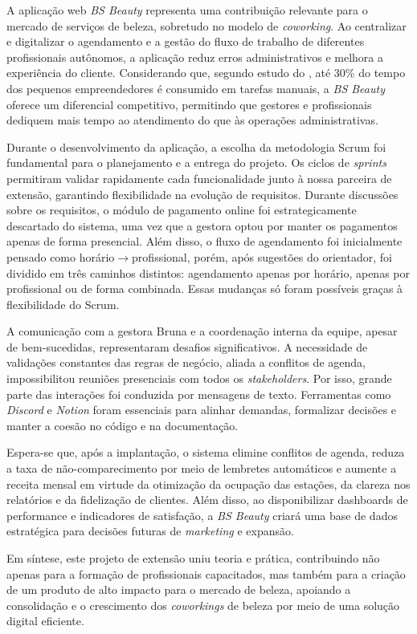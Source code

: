 

A aplicação web \emph{BS Beauty} representa uma contribuição relevante para o mercado de serviços de beleza, sobretudo no modelo de \emph{coworking}. Ao centralizar e digitalizar o agendamento e a gestão do fluxo de trabalho de diferentes profissionais autônomos, a aplicação reduz erros administrativos e melhora a experiência do cliente. Considerando que, segundo estudo do \cite{senac2022}, até 30\% do tempo dos pequenos empreendedores é consumido em tarefas manuais, a \emph{BS Beauty} oferece um diferencial competitivo, permitindo que gestores e profissionais dediquem mais tempo ao atendimento do que às operações administrativas.

Durante o desenvolvimento da aplicação, a escolha da metodologia Scrum foi fundamental para o planejamento e a entrega do projeto. Os ciclos de \emph{sprints} permitiram validar rapidamente cada funcionalidade junto à nossa parceira de extensão, garantindo flexibilidade na evolução de requisitos. Durante discussões sobre os requisitos, o módulo de pagamento online foi estrategicamente descartado do sistema, uma vez que a gestora optou por manter os pagamentos apenas de forma presencial. Além disso, o fluxo de agendamento foi inicialmente pensado como horário$\to$profissional, porém, após sugestões do orientador, foi dividido em três caminhos distintos: agendamento apenas por horário, apenas por profissional ou de forma combinada. Essas mudanças só foram possíveis graças à flexibilidade do Scrum.

A comunicação com a gestora Bruna e a coordenação interna da equipe, apesar de bem-sucedidas, representaram desafios significativos. A necessidade de validações constantes das regras de negócio, aliada a conflitos de agenda, impossibilitou reuniões presenciais com todos os \emph{stakeholders}. Por isso, grande parte das interações foi conduzida por mensagens de texto. Ferramentas como \emph{Discord} e \emph{Notion} foram essenciais para alinhar demandas, formalizar decisões e manter a coesão no código e na documentação.

Espera-se que, após a implantação, o sistema elimine conflitos de agenda, reduza a taxa de não-comparecimento por meio de lembretes automáticos e aumente a receita mensal em virtude da otimização da ocupação das estações, da clareza nos relatórios e da fidelização de clientes. Além disso, ao disponibilizar dashboards de performance e indicadores de satisfação, a \emph{BS Beauty} criará uma base de dados estratégica para decisões futuras de \emph{marketing} e expansão.

Em síntese, este projeto de extensão uniu teoria e prática, contribuindo não apenas para a formação de profissionais capacitados, mas também para a criação de um produto de alto impacto para o mercado de beleza, apoiando a consolidação e o crescimento dos \emph{coworkings} de beleza por meio de uma solução digital eficiente.
